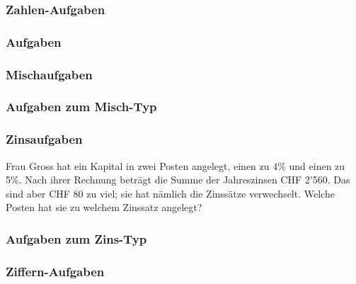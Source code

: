 \subsubsection{Zahlen-Aufgaben}
  \subsubsection*{Aufgaben}
  \newpage
  
\subsubsection{Mischaufgaben}


\subsubsection*{Aufgaben zum Misch-Typ}

\newpage


\subsubsection{Zinsaufgaben}

Frau Gross hat ein Kapital in zwei Posten angelegt, einen zu 4\%
und einen zu 5\%. Nach ihrer Rechnung beträgt die Summe der
Jahreszinsen CHF 2’560. Das sind aber CHF 80 zu viel; sie hat
nämlich die Zinssätze verwechselt. Welche Posten hat sie zu welchem
Zinssatz angelegt?



  \subsubsection*{Aufgaben zum Zins-Typ}

\newpage



\subsubsection{Ziffern-Aufgaben}

